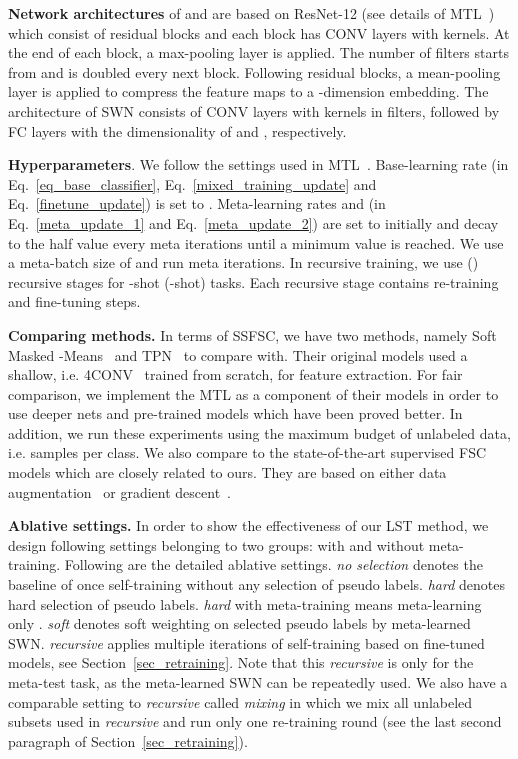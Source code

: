\documentclass{article}
\newcommand{\myparagraph}[1]{\vspace{0.1em}\noindent\textbf{#1}}
\begin{document}
\myparagraph{Network architectures} of  and  are based on ResNet-12 (see details of MTL~\cite{SunCVPR2019}) which 
consist of  residual blocks and each block has  CONV layers with  kernels. 
At the end of each block, a  max-pooling layer is applied. The number of filters starts from  and is doubled every next block.
Following residual blocks, a mean-pooling layer is applied to compress the feature maps to a -dimension embedding. 
The architecture of SWN consists of  CONV layers with  kernels in  filters, followed by  FC layers with the dimensionality of  and , respectively.  

\myparagraph{Hyperparameters}. 
We follow the settings used in MTL~\cite{SunCVPR2019}. 
Base-learning rate  (in Eq.~\ref{eq_base_classifier}, Eq.~\ref{mixed_training_update} and Eq.~\ref{finetune_update}) is set to .
Meta-learning rates  and  (in Eq.~\ref{meta_update_1} and Eq.~\ref{meta_update_2}) are set to  initially and decay to the half value every  meta iterations until a minimum value  is reached.
We use a meta-batch size of  and run  meta iterations. 
In recursive training, we use  () recursive stages for -shot (-shot) tasks.
Each recursive stage contains  re-training and  fine-tuning steps. 


\myparagraph{Comparing methods.}
In terms of SSFSC, we have two methods, namely Soft Masked -Means~\cite{RenICLR2018_semisupervised} and TPN~\cite{LiuICLR2019transductive}
to compare with.
Their original models used a shallow, i.e. 4CONV~\cite{FinnAL17} trained from scratch, for feature extraction. 
For fair comparison, we implement the MTL as a component of their models in order to use deeper nets and pre-trained models which have been proved better.
In addition, we run these experiments using the maximum budget of unlabeled data, i.e.  samples per class.
We also compare to the state-of-the-art supervised FSC models which are closely related to ours.
They are based on either data augmentation~\cite{Mehrotra2017, SchwartzNIPS18} or gradient descent~\cite{FinnAL17, RaviICLR2017, GrantICLR2018, FranceschiICML18, ZhangNIPS2018MetaGAN, MunkhdalaiICML18, RusuICLR2019, SunCVPR2019, LeeCVPR19svm}.




\myparagraph{Ablative settings.}
In order to show the effectiveness of our LST method, we design following settings belonging to two groups: with and without meta-training.
Following are the detailed ablative settings.
\emph{no selection} denotes the baseline of once self-training without any selection of pseudo labels.
\emph{hard} denotes hard selection of pseudo labels. \emph{hard} with meta-training means meta-learning only .
\emph{soft} denotes soft weighting on selected pseudo labels by meta-learned SWN. 
\emph{recursive} applies multiple iterations of self-training based on fine-tuned models, see Section~\ref{sec_retraining}. Note that this \emph{recursive} is only for the meta-test task, as the meta-learned SWN can be repeatedly used.
We also have a comparable setting to \emph{recursive} called \emph{mixing} in which we mix all unlabeled subsets used in \emph{recursive} and run only one re-training round (see the last second paragraph of Section~\ref{sec_retraining}).
\end{document}
